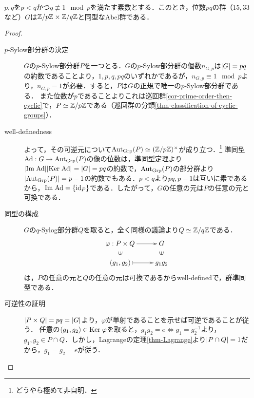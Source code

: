 \documentclass[uplatex,dvipdfmx]{jsreport}
\begin{document}
\begin{proposition}\label{prop-order-pq}
    $p,q$を$p<q$かつ$q\not\equiv1\mod p$を満たす素数とする．このとき，位数$pq$の群（$15,33$など）$G$は$\mathbb{Z}/p\mathbb{Z}\times\mathbb{Z}/q\mathbb{Z}$と同型なAbel群である．
\end{proposition}
\begin{proof}\mbox{}
    \begin{description}
        \item[$p$-Sylow部分群の決定] $G$の$p$-Sylow部分群$P$を一つとる．$G$の$p$-Sylow部分群の個数$n_{G,p}$は$\lvert G\rvert=pq$の約数であることより，$1,p,q,pq$のいずれかであるが，$n_{G,p}\equiv 1\mod p$より，$n_{G,p}=1$が必要．すると，$P$は$G$の正規で唯一の$p$-Sylow部分群である．
        また位数が$p$であることよりこれは巡回群\ref{cor-prime-order-then-cyclic}で，$P\simeq\mathbb{Z}/p\mathbb{Z}$である（巡回群の分類\ref{thm-classification-of-cyclic-groups}）．
        \item[well-definedness] よって，その可逆元について$\mathrm{Aut}_{\mathrm{Grp}}(P)\simeq(\mathbb{Z}/p\mathbb{Z})^\times$が成り立つ．\footnote{どうやら極めて非自明．}
        準同型$\mathrm{Ad}:G\to\mathrm{Aut}_{\mathrm{Grp}}(P)$の像の位数は，準同型定理より$\lvert\mathrm{Im}\;\mathrm{Ad}\rvert\lvert\mathrm{Ker}\;\mathrm{Ad}\rvert=\lvert G\rvert=pq$の約数で，$\mathrm{Aut}_{\mathrm{Grp}}(P)$の部分群より$\lvert\mathrm{Aut}_{\mathrm{Grp}}(P)\rvert=p-1$の約数でもある．$p<q$より$pq,p-1$は互いに素であるから，$\mathrm{Im}\;\mathrm{Ad}=\{\mathrm{id}_P\}$である．したがって，$G$の任意の元は$P$の任意の元と可換である．
        \item[同型の構成]
        $G$の$q$-Sylog部分群$Q$を取ると，全く同様の議論より$Q\simeq\mathbb{Z}/q\mathbb{Z}$である．
        \[\xymatrix@R-2pc{
            \varphi:P\times Q\ar[r]&G\\
            \rotatebox[origin=c]{90}{$\in$}&\rotatebox[origin=c]{90}{$\in$}\\
            (g_1,g_2)\ar@{|->}[r]&g_1g_2
        }\]
        は，$P$の任意の元と$Q$の任意の元は可換であるからwell-definedで，群準同型である．
        \item[可逆性の証明]
        $\lvert P\times Q\rvert=pq=\lvert G\rvert$より，$\varphi$が単射であることを示せば可逆であることが従う．
        任意の$(g_1,g_2)\in\mathrm{Ker}\;\varphi$を取ると，$g_1g_2=e\Leftrightarrow g_1=g_2^{-1}$より，$g_1,g_2\in P\cap Q$．しかし，Lagrangeの定理\ref{thm-Lagrange}より$\lvert P\cap Q\rvert=1$だから，$g_1=g_2=e$が従う．
    \end{description}
\end{proof}
\end{document}
